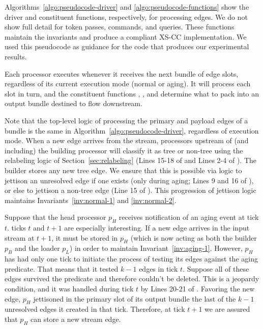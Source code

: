 Algorithms~\ref{algo:pseudocode-driver} and \ref{algo:pseudocode-functions}
show the \XSCC driver and constituent functions, respectively, for 
processing edges. We do not show full detail for token passes, commands,
and queries.
These functions maintain the invariants and produce a compliant XS-CC
implementation.  We used this pseudocode as guidance for the code
that produces our experimental results.

Each \XStream processor executes  whenever it receives
the next bundle of edge slots, regardless of its current execution mode
(normal or aging).  It will process each slot in turn, and the 
constituent functions , ,
and  determine what to pack into an
output bundle destined to flow downstream.

Note that the top-level logic of processing the primary and payload
edges of a bundle is the same in Algorithm~\ref{algo:pseudocode-driver}, 
regardless of execution mode.  When a new
edge arrives from the stream, processors upstream of (and including) the 
building processor will classify it as tree or non-tree using the
relabeling logic of Section~\ref{sec:relabeling} (Lines 15-18 of 
 and Lines 2-4 of ).
The builder stores any new tree edge. We ensure that this is
possible via logic to jettison an unresolved edge if one exists 
(only during aging; Lines 9 and 16 of ), or else 
to jettison a non-tree edge (Line 15
of ).  This progression of jettison logic maintains
Invariants~\ref{inv:normal-1} and \ref{inv:normal-2}.

Suppose that the head processor $p_H$ receives notification of an aging event
at \XStream tick $t$.  \XStream ticks $t$ and $t+1$ are especially interesting. 
If a new edge arrives in the input stream at $t+1$, it must be stored 
in $p_H$ (which
is now acting as both the builder $p_B$ and the loader $p_L$) in
order to maintain Invariant~\ref{inv:aging-1}.  However, $p_H$ has had only
one tick to initiate the process of testing its edges against the aging
predicate.  That means that it tested $k-1$ edges in tick $t$.  Suppose all
of these edges survived the predicate and therefore couldn't be deleted.
This is a jeopardy condition, and it was handled during tick $t$ by 
Lines 20-21 of 
.  Favoring the new edge, $p_H$ jettisoned in the
primary slot of its output bundle the last of the $k-1$ unresolved edges
it created in that tick.  Therefore, at tick $t+1$ we are assured that $p_H$ 
can store a new stream edge.

